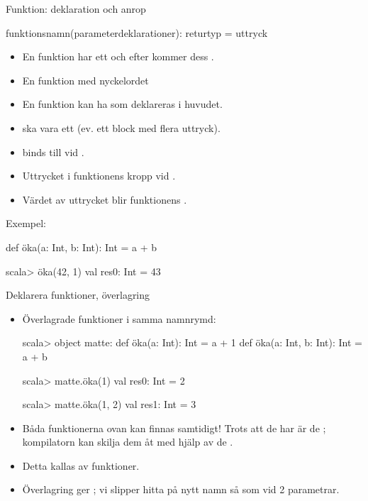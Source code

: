 \begin{Slide}{Funktion: deklaration och anrop}
\SlideOnly{\setlength{\leftmargini}{0pt}}

 funktionsnamn(parameterdeklarationer): returtyp = uttryck
\vspace{0.5em}


\begin{itemize}\SlideFontSmall
  \item En funktion har ett  och efter \code{=} kommer dess .
  \item En  funktion  med nyckelordet 
  \item En funktion kan ha  som deklareras i huvudet. 
  \item {} ska vara ett  (ev. ett block med flera uttryck).
  \item {} binds till  vid .
  \item Uttrycket i funktionens kropp  vid . 
  \item Värdet av uttrycket blir funktionens . 
\end{itemize}

\pause
Exempel:
\begin{Code}
def öka(a: Int, b: Int): Int = a + b
\end{Code}
\pause
\begin{REPLnonum}
scala> öka(42, 1)
val res0: Int = 43
\end{REPLnonum}

\end{Slide}


\begin{Slide}{Deklarera funktioner, överlagring}
\begin{itemize}
\item Överlagrade funktioner i samma namnrymd:
\begin{REPL}
scala> object matte:
         def öka(a: Int): Int = a + 1
         def öka(a: Int, b: Int): Int = a + b

scala> matte.öka(1)
val res0: Int = 2

scala> matte.öka(1, 2)
val res1: Int = 3

\end{REPL}
\item Båda funktionerna ovan kan finnas samtidigt! Trots att de har  är de ; kompilatorn kan skilja dem åt med hjälp av de .

\item Detta kallas   av funktioner.
\item Överlagring ger ; vi slipper hitta på nytt namn så som  vid 2 parametrar.
\end{itemize}
\end{Slide}



